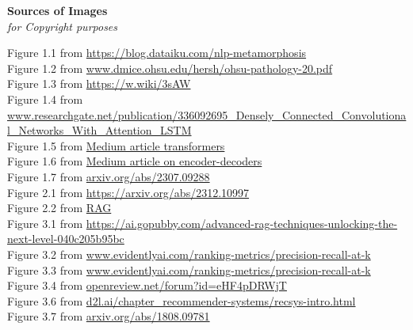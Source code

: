 \begin{landscape}
	\thispagestyle{empty}
	\begin{center}
		\Huge{\textbf{Sources of Images}} \\
		\normalsize{\textit{for Copyright purposes}}
	\end{center}
	Figure 1.1 from \url{https://blog.dataiku.com/nlp-metamorphosis} \\
	Figure 1.2 from \url{www.dmice.ohsu.edu/hersh/ohsu-pathology-20.pdf} \\
	Figure 1.3 from \url{https://w.wiki/3sAW} \\
	Figure 1.4 from \url{www.researchgate.net/publication/336092695_Densely_Connected_Convolutional_Networks_With_Attention_LSTM} \\
   Figure 1.5 from \href{https://www.medium.com/huggingface/encoder-decoders-in-transformers-a-hybrid-pre-trained-architecture-for-seq2seqaf4d7bf14bb8}{Medium article  transformers}\\
	Figure 1.6 from \href{https://medium.com/@anishnama20/exploring-the-power-of-encoder-decoder-models-pros-cons-and-applications-8bfbe2e66e76}{Medium article on encoder-decoders }	\\
	Figure 1.7 from \url{arxiv.org/abs/2307.09288} \\
	Figure 2.1 from \url{https://arxiv.org/abs/2312.10997} \\
	Figure 2.2 from \href{https://www.researchgate.net/figure/High-level-overview-of-a-possible-solution-using-RAG-and-a-multi-modal-in-context_fig1_380540048}{RAG } \\
   Figure 3.1 from \url{https://ai.gopubby.com/advanced-rag-techniques-unlocking-the-next-level-040c205b95bc} \\
	Figure 3.2 from \url{www.evidentlyai.com/ranking-metrics/precision-recall-at-k} \\
	Figure 3.3 from \url{www.evidentlyai.com/ranking-metrics/precision-recall-at-k} \\
	Figure 3.4 from \url{openreview.net/forum?id=eHF4pDRWjT} \\
	Figure 3.6 from \url{d2l.ai/chapter_recommender-systems/recsys-intro.html} \\
	Figure 3.7 from \url{arxiv.org/abs/1808.09781} \\
\end{landscape}
